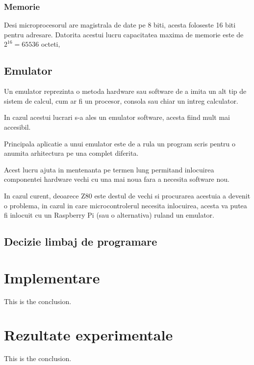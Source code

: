 \documentclass[titlepage]{article}
\begin{document}
\subsubsection{Memorie}

Desi microprocesorul are magistrala de date pe 8 biti, acesta foloseste 16 biti pentru adresare. Datorita acestui lucru capacitatea maxima de memorie este de \(2^16=65536\) octeti, 

\subsection{Emulator}
Un emulator reprezinta o metoda hardware sau software de a imita un alt tip de sistem de calcul, cum ar fi un procesor, consola sau chiar un intreg calculator.

In cazul acestui lucrari s-a ales un emulator software, acesta fiind mult mai accesibil.

Principala aplicatie a unui emulator este de a rula un program scris pentru o anumita arhitectura pe una complet diferita.

Acest lucru ajuta in mentenanta pe termen lung permitand inlocuirea componentei hardware vechi cu una mai noua fara a necesita software nou.

In cazul curent, deoarece \ac {Z80} este destul de vechi si procurarea acestuia a devenit o problema, in cazul in care microcontrolerul necesita inlocuirea, acesta va putea fi inlocuit cu un Raspberry Pi (sau o alternativa) ruland un emulator.


%

\subsection{Decizie limbaj de programare}

\section{Implementare}
This is the conclusion.

\section{Rezultate experimentale}
This is the conclusion.
\end{document}
